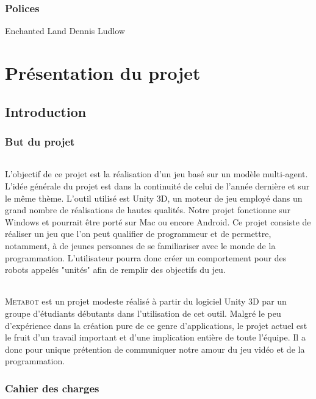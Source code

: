 \documentclass{report}
\begin{document}
\section*{Polices}
\noindent
Enchanted Land\newline
Dennis Ludlow

\tableofcontents
\newpage
\part{Présentation du projet}
\chapter{Introduction}
\section{But du projet}
\paragraph{}
L'objectif de ce projet est la réalisation d'un jeu basé sur un modèle multi-agent. L'idée générale du projet est dans la continuité de celui de l'année dernière et sur le même thème. L'outil utilisé est Unity 3D, un moteur de jeu employé dans un grand nombre de réalisations de hautes qualités. Notre projet fonctionne sur Windows et pourrait être porté sur Mac ou encore Android.
Ce projet consiste de réaliser un jeu que l'on peut qualifier de programmeur et de permettre, notamment, à de jeunes personnes de se familiariser avec le monde de la programmation. L'utilisateur pourra donc créer un comportement pour des robots appelés "unités" afin de remplir des objectifs du jeu.
\paragraph{}
\textsc{Metabot} est un projet modeste réalisé à partir du logiciel Unity 3D par un groupe d'étudiants débutants dans l'utilisation de cet outil. Malgré le peu d'expérience dans la création pure de ce genre d'applications, le projet actuel est le fruit d'un travail important et d'une implication entière de toute l'équipe.
Il a donc pour unique prétention de communiquer notre amour du jeu vidéo et de la programmation.

\section{Cahier des charges}
\end{document}
